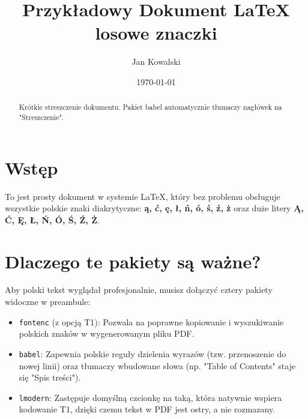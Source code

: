 \documentclass[11pt, a4paper]{article}
\begin{document}
	
	\title{Przykładowy Dokument LaTeX losowe znaczki}
	\author{Jan Kowalski}
	\date{\today}
	\maketitle
	
	\begin{abstract}
		Krótkie streszczenie dokumentu. Pakiet babel automatycznie tłumaczy nagłówek na "Streszczenie".
	\end{abstract}
	
	\section{Wstęp}
	To jest prosty dokument w systemie \LaTeX{}, który bez problemu obsługuje wszystkie polskie znaki diakrytyczne: 
	\textbf{ą, ć, ę, ł, ń, ó, ś, ź, ż} oraz duże litery \textbf{Ą, Ć, Ę, Ł, Ń, Ó, Ś, Ź, Ż}.
	
	\section{Dlaczego te pakiety są ważne?}
	Aby polski tekst wyglądał profesjonalnie, musisz dołączyć cztery pakiety widoczne w preambule:
	
	\begin{itemize}
		\item \texttt{fontenc} (z opcją T1): Pozwala na poprawne kopiowanie i wyszukiwanie polskich znaków w wygenerowanym pliku PDF.
		\item \texttt{babel}: Zapewnia polskie reguły dzielenia wyrazów (tzw. przenoszenie do nowej linii) oraz tłumaczy wbudowane słowa (np. "Table of Contents" staje się "Spis treści").
		\item \texttt{lmodern}: Zastępuje domyślną czcionkę na taką, która natywnie wspiera kodowanie T1, dzięki czemu tekst w PDF jest ostry, a nie rozmazany.
	\end{itemize}
	
\end{document}

